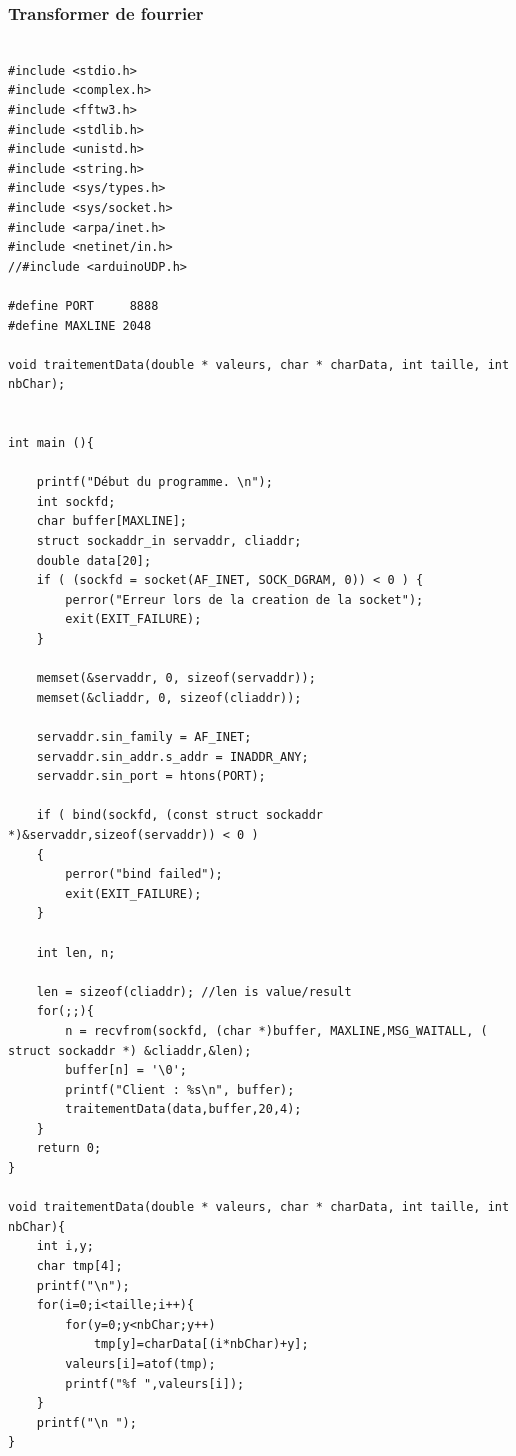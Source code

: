 \documentclass[12pt,french,a4paper]{article}
\begin{document}
\subsubsection*{Transformer de fourrier}
\begin{scriptsize}
\begin{lstlisting}

#include <stdio.h>
#include <complex.h>
#include <fftw3.h>
#include <stdlib.h>
#include <unistd.h>
#include <string.h>
#include <sys/types.h>
#include <sys/socket.h>
#include <arpa/inet.h>
#include <netinet/in.h>
//#include <arduinoUDP.h>

#define PORT	 8888
#define MAXLINE 2048

void traitementData(double * valeurs, char * charData, int taille, int nbChar);


int main (){

	printf("Début du programme. \n");
	int sockfd;
	char buffer[MAXLINE];
	struct sockaddr_in servaddr, cliaddr;
	double data[20];
	if ( (sockfd = socket(AF_INET, SOCK_DGRAM, 0)) < 0 ) {
		perror("Erreur lors de la creation de la socket");
		exit(EXIT_FAILURE);
	}

	memset(&servaddr, 0, sizeof(servaddr));
	memset(&cliaddr, 0, sizeof(cliaddr));

	servaddr.sin_family = AF_INET; 
	servaddr.sin_addr.s_addr = INADDR_ANY;
	servaddr.sin_port = htons(PORT);

	if ( bind(sockfd, (const struct sockaddr *)&servaddr,sizeof(servaddr)) < 0 )
	{
		perror("bind failed");
		exit(EXIT_FAILURE);
	}

	int len, n;

	len = sizeof(cliaddr); //len is value/result
	for(;;){
		n = recvfrom(sockfd, (char *)buffer, MAXLINE,MSG_WAITALL, ( struct sockaddr *) &cliaddr,&len);
		buffer[n] = '\0';
		printf("Client : %s\n", buffer);
		traitementData(data,buffer,20,4);
	}
	return 0;
}

void traitementData(double * valeurs, char * charData, int taille, int nbChar){
	int i,y;
	char tmp[4];
	printf("\n");
	for(i=0;i<taille;i++){
		for(y=0;y<nbChar;y++)
			tmp[y]=charData[(i*nbChar)+y];
		valeurs[i]=atof(tmp);
		printf("%f ",valeurs[i]);
	}
	printf("\n ");
}
\end{lstlisting}
\end{scriptsize} 
\end{document}
